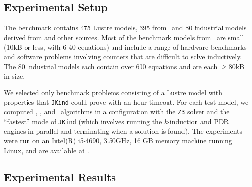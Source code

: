 \subsection{Experimental Setup}
The benchmark contains 475 Lustre models, 395 from~\cite{Hagen08:FMCAD} and 80 industrial models derived from \cite{hilt2013} and other sources.  Most of the benchmark models from~\cite{Hagen08:FMCAD} are small (10kB or less, with 6-40 equations) and include a range of hardware benchmarks and software problems involving counters that are difficult to solve inductively.
The 80 industrial models each contain over 600 equations and are each $\geq$80kB in size.

We selected only benchmark problems consisting of a Lustre model with
properties that \texttt{JKind} could prove with an hour timeout.
For each test model, we computed \aivcalg, \ucalg, and \ucbfalg ~algorithms in a configuration with the \texttt{Z3} solver and the ``fastest'' mode of \texttt{JKind} (which involves running the $k$-induction and PDR engines in parallel and terminating when a solution is found). The experiments were run on an  Intel(R) i5-4690, 3.50GHz, 16 GB memory machine running Linux, and are available at~\cite{expr}. %



\subsection{Experimental Results}

 